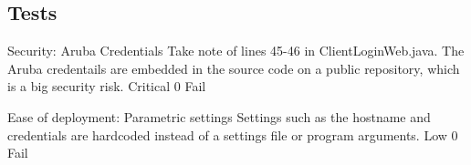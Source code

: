 \subsection{Tests}
\NonFuncReq
{Security: Aruba Credentials}
{Take note of lines 45-46 in ClientLoginWeb.java. The Aruba credentails are embedded in the source code on a public repository, which is a big security risk.}
{Critical}
{0}
{Fail}

{Ease of deployment: Parametric settings}
{Settings such as the hostname and credentials are hardcoded instead of a settings file or program arguments.}
{Low}
{0}
{Fail}


